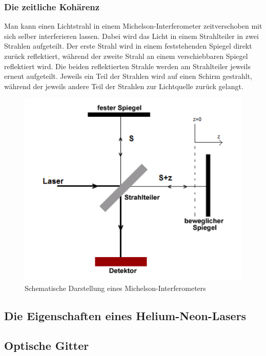 \subsubsection{Die zeitliche Kohärenz}
Man kann einen Lichtstrahl in einem Michelson-Interferometer zeitverschoben mit sich selber interferieren lassen. Dabei wird das Licht in einem Strahlteiler in zwei Strahlen aufgeteilt. Der erste Strahl wird in einem feststehenden Spiegel direkt zurück reflektiert, während der zweite Strahl an einem verschiebbaren Spiegel reflektiert wird. Die beiden reflektierten Strahle werden am Strahlteiler jeweils erneut aufgeteilt. Jeweils ein Teil der Strahlen wird auf einen Schirm gestrahlt, während der jeweils andere Teil der Strahlen zur Lichtquelle zurück gelangt. 

\begin{figure}[h]
\begin{center}
\includegraphics[scale=0.5]{img/holo4}
\caption{Schematische Darstellung eines Michelson-Interferometers}
\end{center}
\end{figure}
 
\newpage
\subsection{Die Eigenschaften eines Helium-Neon-Lasers}

\subsection{Optische Gitter}

